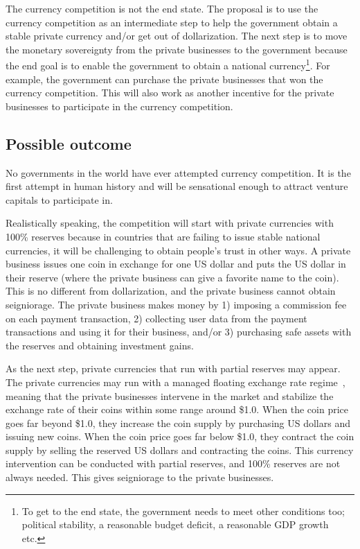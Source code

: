 \documentclass[dvipdfmx,a4paper]{article}
\begin{document}
The currency competition is not the end state. The proposal is to use the currency competition as an intermediate step to help the government obtain a stable private currency and/or get out of dollarization. The next step is to move the monetary sovereignty from the private businesses to the government because the end goal is to enable the government to obtain a national currency\footnote{To get to the end state, the government needs to meet other conditions too; political stability, a reasonable budget deficit, a reasonable GDP growth etc.}. For example, the government can purchase the private businesses that won the currency competition. This will also work as another incentive for the private businesses to participate in the currency competition.

\subsection{Possible outcome}

No governments in the world have ever attempted currency competition. It is the first attempt in human history and will be sensational enough to attract venture capitals to participate in.

Realistically speaking, the competition will start with private currencies with 100\% reserves because in countries that are failing to issue stable national currencies, it will be challenging to obtain people's trust in other ways. A private business issues one coin in exchange for one US dollar and puts the US dollar in their reserve (where the private business can give a favorite name to the coin). This is no different from dollarization, and the private business cannot obtain seigniorage. The private business makes money by 1) imposing a commission fee on each payment transaction, 2) collecting user data from the payment transactions and using it for their business, and/or 3) purchasing safe assets with the reserves and obtaining investment gains.

As the next step, private currencies that run with partial reserves may appear. The private currencies may run with a managed floating exchange rate regime~\cite{calvo2002fear}, meaning that the private businesses intervene in the market and stabilize the exchange rate of their coins within some range around \$1.0. When the coin price goes far beyond \$1.0, they increase the coin supply by purchasing US dollars and issuing new coins. When the coin price goes far below \$1.0, they contract the coin supply by selling the reserved US dollars and contracting the coins. This currency intervention can be conducted with partial reserves, and 100\% reserves are not always needed. This gives seigniorage to the private businesses.
\end{document}
